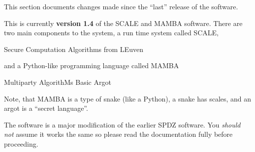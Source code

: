 
This section documents changes made since the ``last'' release of
the software. 

\vspace{5mm}

\noindent
This is currently {\bf version 1.4} of the SCALE and MAMBA software.
There are two main components to the system, a run time system called
SCALE,
\begin{center}
  Secure Computation Algorithms from LEuven
\end{center}
and a Python-like programming language called MAMBA
\begin{center}
  Multiparty AlgorithMs Basic Argot
\end{center}
Note, that MAMBA is a type of snake (like a Python), a snake
has scales, and an argot is a ``secret language''.

\vspace{5mm}

\noindent
The software is a major modification of the earlier SPDZ software. 
You {\em should not} assume it works the same so please read
the documentation fully before proceeding.

